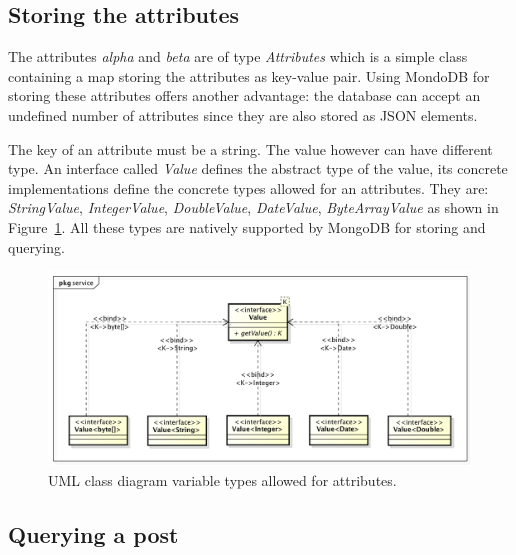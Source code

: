 \documentclass[oneside]{scrreprt}
\newcommand{\fig}[1]{Figure~\ref{#1}}
\begin{document}
\subsection{Storing the attributes}

The attributes \emph{alpha} and \emph{beta} are of type \emph{Attributes} which is a simple class containing a map storing the attributes as key-value pair. Using MondoDB for storing these attributes offers another advantage: the database can accept an undefined number of attributes since they are also stored as JSON elements.

The key of an attribute must be a string. The value however can have different type. An interface called \emph{Value} defines the abstract type of the value, its concrete implementations define the concrete types allowed for an attributes. They are: \emph{StringValue}, \emph{IntegerValue}, \emph{DoubleValue}, \emph{DateValue}, \emph{ByteArrayValue} as shown in \fig{fig:value-type}. All these types are natively supported by MongoDB for storing and querying.

\begin{figure}[ht]
\centerline{
\includegraphics[width=1.0\textwidth]{figs/value_type}}
\caption{UML class diagram variable types allowed for attributes.}
\label{fig:value-type}
\end{figure}


\subsection{Querying a post}
\end{document}
